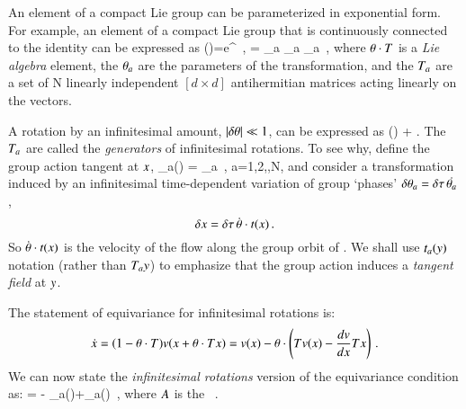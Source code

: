 An element of a compact Lie group can be parameterized in exponential form.
For example, an element of a compact Lie group that is continuously connected to the identity can be expressed as
\beq
\LieEl(\gSpace)=e^{{\gSpace} \cdot \Lg }
    \,,\qquad
\gSpace \cdot \Lg = \sum_a \gSpace_a \Lg_a
\,,
where $\gSpace \cdot \Lg $ is a \emph{Lie algebra} element, the $\gSpace_a$ are the parameters of the transformation, and the $\Lg_a$ are a set of N linearly independent $[d\!\times\!d]$ antihermitian matrices acting linearly on the {\statesp} vectors.
%

A rotation by an infinitesimal amount, $|\delta \gSpace| \ll 1$, can be  expressed as
\beq
\LieEl(\delta \gSpace)  + \delta \gSpace \cdot \Lg.
The $\Lg_a$  are called the \emph{generators} of infinitesimal rotations. To see why, define the group action tangent at $\ssp$,
\beq
 \groupTan_{a}(\ssp) = \Lg _{a} \ssp
    \,,\qquad
 a=1,2,\cdots,N,
and consider a transformation induced by an infinitesimal
time-dependent variation of group `phases'
$\delta \gSpace_a = \timeStep \, \dot{\gSpace_a}$,
\[
\delta \ssp = \timeStep \, \dot{\gSpace} \cdot \groupTan(\ssp)
\,.
\]
So $\dot{{\bf \theta}} \cdot t(x)$ is the velocity
of the flow along the group orbit of \ssp.
We shall use $t_a(y)$ notation (rather than
$T_{a}y$) to emphasize that the group action
induces a \emph{tangent field} at $y$.

The statement of equivariance
 for infinitesimal rotations is:
\[
\dot{x}=(1-{\bf \theta} \cdot T ) v(x+{\bf \theta} \cdot T  x)
       =v(x)-{\bf \theta} \cdot \left(
            T v(x) - \frac{dv}{dx} T x
                     \right)
\,.
\]
We can now state the {\em infinitesimal
rotations} version of the equivariance condition
 as:
 = - \groupTan_{a}(\vel)+\Mvar \groupTan_{a}(\ssp)
\,,
\label{eq:InfnmslRot}
\eeq
where $A$ is the \stabmat\ .

